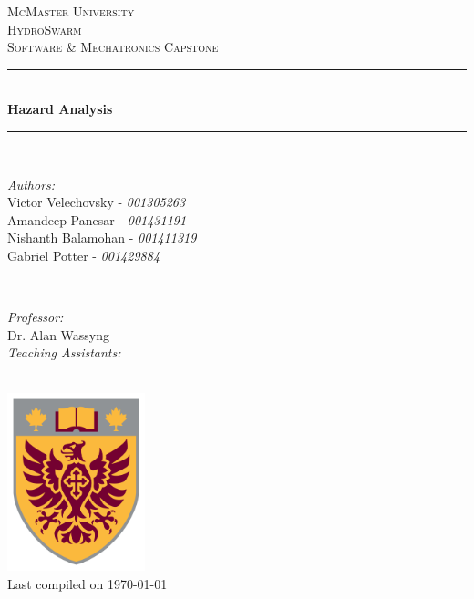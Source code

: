 \documentclass[11pt]{article}
\begin{document}
\begin{titlepage}
	\newcommand{\HRule}{\rule{\linewidth}{0.2mm}}
	\begin{center}
	\textsc{\LARGE McMaster University}\\[1.5cm]

	\textsc{\Large HydroSwarm}\\[0.5cm]
	\textsc{\large Software \& Mechatronics Capstone}\\[0.5cm]

	\HRule\\[0.4cm]
		{\huge\bfseries Hazard Analysis}\\[0.4cm]
	\HRule\\[0.4cm]

	\begin{minipage}[t][][t]{0.5\textwidth}
		\begin{flushleft} \large
			\emph{Authors:}\\
			Victor Velechovsky - \textit{001305263} \\
			Amandeep Panesar - \textit{001431191} \\ 
			Nishanth Balamohan - \textit{001411319}\\
			Gabriel Potter - \textit{001429884}\\
		\end{flushleft}
	\end{minipage}
	~
	\begin{minipage}[t][][t]{0.4\textwidth}
		\begin{flushright} \large
			\emph{Professor:} \\
			Dr. Alan Wassyng \\[0.4cm]
			\emph{Teaching Assistants:} \\
		\end{flushright}
	\end{minipage}\\[2cm]

	\includegraphics[width=0.3\textwidth]{logo.png} \\
	{\large Last compiled on \today}
	\end{center}

\end{titlepage}
\end{document}
